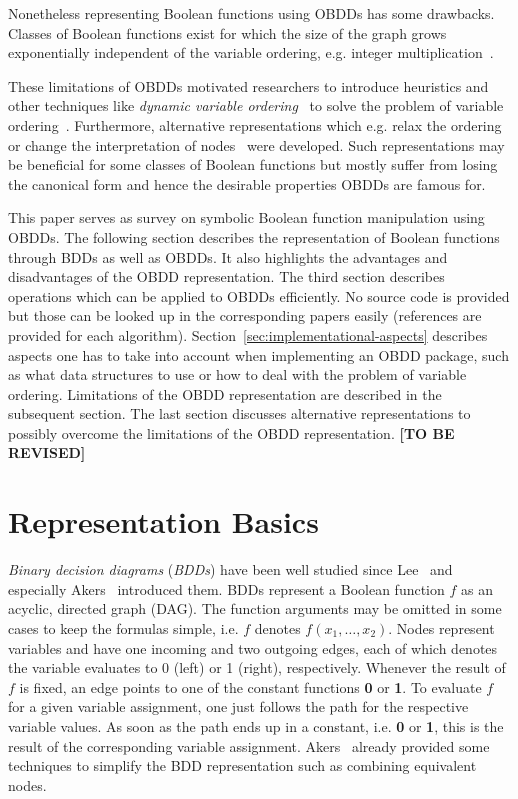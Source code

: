 \documentclass{vldb}
\newcommand{\tbr}{\textbf{[TO BE REVISED]}}
\begin{document}
Nonetheless representing Boolean functions using OBDDs has some drawbacks. Classes
of Boolean functions exist for which the size of the graph grows exponentially
independent of the variable ordering, e.g. integer
multiplication~\cite{BRYANT86, BRYANT91, WOELFEL01}.

These limitations of OBDDs motivated researchers to introduce heuristics and
other techniques like \textit{dynamic variable ordering}~\cite{RUDELL93} to solve
the problem of variable ordering~\cite{BOLLIG96}. Furthermore, alternative
representations which e.g. relax the ordering~\cite{BRYANT95} or change the
interpretation of nodes~\cite{BRYANT95, ANDERSEN97} were developed. Such
representations may be beneficial for some classes of Boolean functions but mostly
suffer from losing the canonical form and hence the desirable properties OBDDs
are famous for.

This paper serves as survey on symbolic Boolean function manipulation using OBDDs.
The following section describes the representation of Boolean functions through
BDDs as well as OBDDs. It also highlights the advantages and disadvantages of the
OBDD representation. The third section describes operations which can be applied
to OBDDs efficiently. No source code is provided but those can be looked up in
the corresponding papers easily (references are provided for each algorithm).
Section~\ref{sec:implementational-aspects} describes aspects one has to take into
account when implementing an OBDD package, such as what data structures to use
or how to deal with the problem of variable ordering. Limitations of the OBDD
representation are described in the subsequent section. The last section
discusses alternative representations to possibly overcome the limitations of
the OBDD representation. \tbr

\section{Representation Basics}
\label{sec:representation-basics}

\textit{Binary decision diagrams} (\textit{BDDs}) have been well studied since
Lee~\cite{LEE59} and especially Akers~\cite{AKERS78} introduced them. BDDs
represent a Boolean function $f$ as an acyclic, directed graph (DAG). The function
arguments may be omitted in some cases to keep the formulas simple, i.e. $f$
denotes $f(x_1, \ldots, x_2)$. Nodes represent variables and have one incoming
and two outgoing edges, each of which denotes the variable evaluates to 0 (left)
or 1 (right), respectively. Whenever the result of $f$ is fixed, an edge points
to one of the constant functions \textbf{0} or \textbf{1}. To evaluate $f$ for a
given variable assignment, one just follows the path for the respective variable
values. As soon as the path ends up in a constant, i.e. \textbf{0} or \textbf{1},
this is the result of the corresponding variable assignment. Akers~\cite{AKERS78}
already provided some techniques to simplify the BDD representation such as
combining equivalent nodes.
\end{document}
